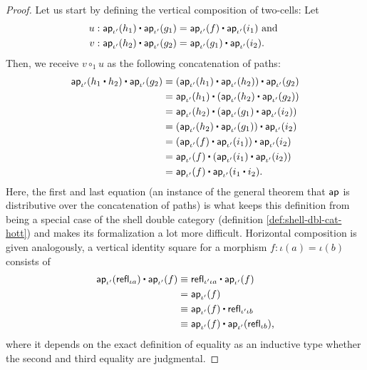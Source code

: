 \begin{proof}
Let us start by defining the vertical composition of two-cells:
Let 
\begin{align*}
u &: \apiop(h_1) \ct \apiop(g_1) = \apiop(f) \ct \apiop(i_1) \text{ and } \\
v &: \apiop(h_2) \ct \apiop(g_2) = \apiop(g_1) \ct \apiop(i_2) \text{.}
\end{align*}
Then, we receive $v \circ_1 u$ as the following concatenation of paths:
\begin{align*}
\apiop (h_1 \ct h_2) \ct \apiop(g_2) &= (\apiop(h_1) \ct \apiop(h_2)) \ct \apiop(g_2) \\
	&= \apiop(h_1) \ct (\apiop(h_2) \ct \apiop(g_2)) \\
	&= \apiop(h_2) \ct (\apiop(g_1) \ct \apiop(i_2)) \\
	&= (\apiop(h_2) \ct \apiop(g_1)) \ct \apiop(i_2) \\
	&= (\apiop(f) \ct \apiop(i_1)) \ct \apiop(i_2) \\
	&= \apiop(f) \ct (\apiop(i_1) \ct \apiop(i_2)) \\
	&= \apiop(f) \ct \apiop(i_1 \ct i_2) \text{.} \\
\end{align*}
Here, the first and last equation (an instance of the general theorem that $\mathsf{ap}$
is distributive over the concatenation of paths) is what keeps this definition from
being a special case of the shell double category (definition \ref{def:shell-dbl-cat-hott})
and makes its formalization a lot more difficult. Horizontal composition is given
analogously, a vertical identity square for a morphism $f : \iota(a) = \iota(b)$
consists of
\begin{align*}
\apiop(\refl_{\iota a}) \ct \apiop(f) &\equiv \refl_{\iota' \iota a} \ct \apiop(f) \\
	&= \apiop(f) \\
	&\equiv \apiop(f) \ct \refl_{\iota' \iota b} \\
	&\equiv \apiop(f) \ct \apiop(\refl_{\iota b}) \text{,} \\
\end{align*}
where it depends on the exact definition of equality as an inductive type whether
the second and third equality are judgmental.


\end{proof}
